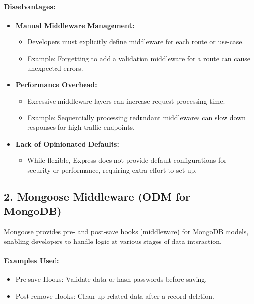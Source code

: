 \paragraph{Disadvantages:}
\begin{itemize}
    \item \textbf{Manual Middleware Management:}
    \begin{itemize}
        \item Developers must explicitly define middleware for each route or use-case.
        \item Example: Forgetting to add a validation middleware for a route can cause unexpected errors.
    \end{itemize}
    \item \textbf{Performance Overhead:}
    \begin{itemize}
        \item Excessive middleware layers can increase request-processing time.
        \item Example: Sequentially processing redundant middlewares can slow down responses for high-traffic endpoints.
    \end{itemize}
    \item \textbf{Lack of Opinionated Defaults:}
    \begin{itemize}
        \item While flexible, Express does not provide default configurations for security or performance, requiring extra effort to set up.
    \end{itemize}
\end{itemize}

\subsection*{2. Mongoose Middleware (ODM for MongoDB)}
Mongoose provides pre- and post-save hooks (middleware) for MongoDB models, enabling developers to handle logic at various stages of data interaction.

\paragraph{Examples Used:}
\begin{itemize}
    \item Pre-save Hooks: Validate data or hash passwords before saving.
    \item Post-remove Hooks: Clean up related data after a record deletion.
\end{itemize}

